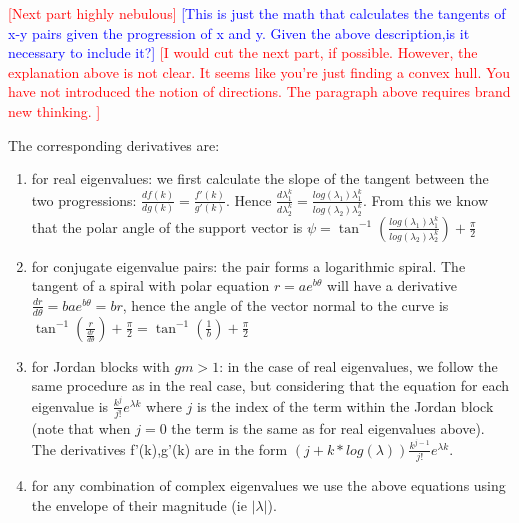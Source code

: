 \documentclass[twocolumn]{autart}    %
\renewcommand{\note}[1]{\textcolor{red}{[#1]}}
\begin{document}
\textcolor{red}{[Next part highly nebulous]} 
\textcolor{blue}{[This is just the math that calculates the tangents of x-y pairs given the progression of x and y. Given the above description,is it necessary to include it?]}
\note{I would cut the next part, if possible. However, the explanation above is not clear. It seems like you're just finding a convex hull. You have not introduced the notion of directions. The paragraph above requires brand new thinking. }

The corresponding derivatives are:
%
\begin{enumerate}
%
\item for real eigenvalues: we first calculate the slope of the tangent
between the two progressions: $\frac{d f(k)}{d g(k)}=\frac{f'(k)}{g'(k)}$. 
Hence $\frac{d \lambda_1^k}{d \lambda_2^k}=\frac{log(\lambda_1)
\lambda_1^k}{log(\lambda_2) \lambda_2^k}$.  From this we know that the polar
angle of the support vector is $\psi = \tan^{-1}(\frac{log(\lambda_1)
\lambda_1^k}{log(\lambda_2) \lambda_2^k})+\frac{\pi}{2}$
%
\item for conjugate eigenvalue pairs: the pair forms a logarithmic spiral. 
The tangent of a spiral with polar equation $r=a e^{b\theta}$ will have a
derivative $\frac{d r}{d \theta}=b a e^{b\theta}=b r$, hence the angle of
the vector normal to the curve is $\tan^{-1}(\frac{r}{\frac{d r}{d
\theta}})+\frac{\pi}{2}=\tan^{-1}(\frac{1}{b})+\frac{\pi}{2}$
%
\item for Jordan blocks with $gm>1$: in the case of real eigenvalues, we
follow the same procedure as in the real case, but considering that the
equation for each eigenvalue is $\frac{k^j}{j!}e^{\lambda k}$ where $j$ is
the index of the term within the Jordan block (note that when $j=0$ the term
is the same as for real eigenvalues above).  The derivatives f'(k),g'(k) are
in the form $(j+k*log(\lambda))\frac{k^{j-1}}{j!}e^{\lambda k}$.
%
\item for any combination of complex eigenvalues we use the above equations
using the envelope of their magnitude (ie $|\lambda|$).
%
\end{enumerate}
\end{document}
